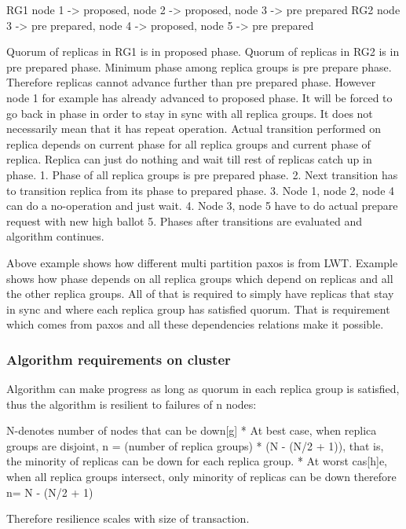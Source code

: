 RG1 { node 1 -> proposed, node 2 -> proposed, node 3 -> pre prepared }
RG2 { node 3 -> pre prepared, node 4 -> proposed, node 5 -> pre prepared }


Quorum of replicas in RG1 is in proposed phase.
Quorum of replicas in RG2 is in pre prepared phase.
Minimum phase among replica groups is pre prepare phase.
        Therefore replicas cannot advance further than pre prepared phase. However node 1 for example has already advanced to proposed phase. It will be forced to go back in phase in order to stay in sync with all replica groups. It does not necessarily mean that it has repeat operation. Actual transition performed on replica depends on current phase for all replica groups and current phase of replica. Replica can just do nothing and wait till rest of replicas catch up in phase.
1. Phase of all replica groups is pre prepared phase.
2. Next transition has to transition replica from its phase to prepared phase.
3. Node 1, node 2, node 4 can do a no-operation and just wait.
4. Node 3, node 5 have to do actual prepare request with new high ballot
5. Phases after transitions are evaluated and algorithm continues.
        
Above example shows how different multi partition paxos is from LWT. Example shows how phase depends on all replica groups which depend on replicas and all the other replica groups. All of that is required to simply have replicas that stay in sync and where each replica group has satisfied quorum. That is requirement which comes from paxos and all these dependencies relations make it possible.


\subsubsection{Algorithm requirements on cluster}
Algorithm can make progress as long as quorum in each replica group is satisfied, thus the algorithm is resilient to failures of n nodes:


        N-denotes number of nodes that can be down[g]
* At best case, when replica groups are disjoint, n = (number of replica groups) * (N - (N/2 + 1)), that is, the minority of replicas can be down for each replica group.
* At worst cas[h]e, when all replica groups intersect, only minority of replicas can be down therefore n= N - (N/2 + 1)



Therefore resilience scales with size of transaction.


